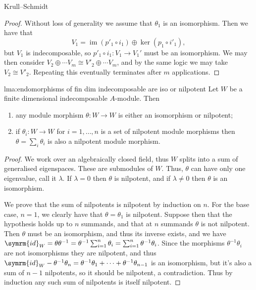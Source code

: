\documentclass[fleqn]{NotesClass}
\newcommand{\id}{\symrm{id}}
\DeclareMathOperator{\im}{im}
\newcommand{\isomorphic}{\cong}
\begin{document}
\begin{thm}{Krull--Schmidt}{}
\begin{proof}
            Without loss of generality we assume that \(\theta_1\) is an isomorphism.
            Then we have that
            \begin{equation}
                V_1 = \im(p'_1 \circ i_1) \oplus \ker(p_1 \circ i'_1),
            \end{equation}
            but \(V_1\) is indecomposable, so \(p'_1 \circ i_1 \colon V_1 \to V_1'\) must be an isomorphism.
            We may then consider \(V_2 \oplus \dotsb V_m \isomorphic V'_2 \oplus \dotsb V_m\), and by the same logic we may take \(V_2 \isomorphic V'_2\).
            Repeating this eventually terminates after \(m\) applications.
        \end{proof}
    \end{thm}
    
    
    
    \begin{lma}{}{lma:endomorphisms of fin dim indecomposable are iso or nilpotent}
        Let \(W\) be a finite dimensional indecomposable \(A\)-module.
        Then
        \begin{enumerate}
            \item any module morphism \(\theta \colon W \to W\) is either an isomorphism or nilpotent;
            \item if \(\theta_i \colon W \to W\) for \(i = 1, \dotsc, n\) is a set of nilpotent module morphisms then \(\theta = \sum_i \theta_i\) is also a nilpotent module morphism.
        \end{enumerate}
        \begin{proof}
            We work over an algebraically closed field, thus \(W\) splits into a sum of generalised eigenspaces.
            These are submodules of \(W\).
            Thus, \(\theta\) can have only one eigenvalue, call it \(\lambda\).
            If \(\lambda = 0\) then \(\theta\) is nilpotent, and if \(\lambda \ne 0\) then \(\theta\) is an isomorphism.
            
            We prove that the sum of nilpotents is nilpotent by induction on \(n\).
            For the base case, \(n = 1\), we clearly have that \(\theta = \theta_1\) is nilpotent.
            Suppose then that the hypothesis holds up to \(n\) summands, and that at \(n\) summands \(\theta\) is not nilpotent.
            Then \(\theta\) must be an isomorphism, and thus its inverse exists, and we have \(\id_W = \theta \theta^{-1} = \theta^{-1} \sum_{i=1}^n \theta_i = \sum_{i=1}^n \theta^{-1}\theta_i\).
            Since the morphisms \(\theta^{-1}\theta_i\) are not isomorphisms they are nilpotent, and thus \(\id_W - \theta^{-1}\theta_n = \theta^{-1}\theta_1 + \dotsb + \theta^{-1}\theta_{n-1}\) is an isomorphism, but it's also a sum of \(n - 1\) nilpotents, so it should be nilpotent, a contradiction.
            Thus by induction any such sum of nilpotents is itself nilpotent.
        \end{proof}
    \end{lma}
    
\end{document}
